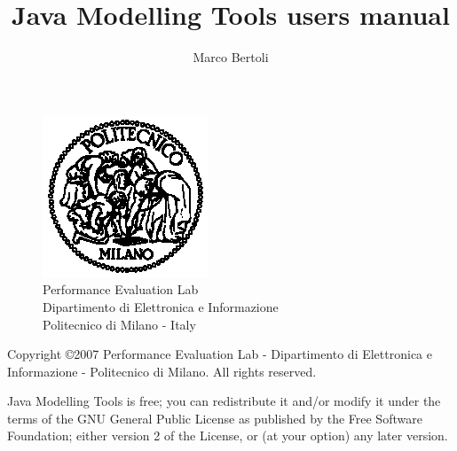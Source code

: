 \documentclass[10pt, twoside, a4paper]{book}
\author{Marco Bertoli}
\title{Java Modelling Tools users manual}
\begin{document}
\pagestyle{headings}  \setcounter{page}{-1}

\begin{titlepage}
\begin{figure}[h]
\begin{center}
\includegraphics{img/poli}\\
Performance Evaluation Lab\\
Dipartimento di Elettronica e Informazione\\
Politecnico di Milano - Italy
\end{center}
\end{figure}
\newlength{\centeroffset}
\setlength{\centeroffset}{-0.5\oddsidemargin}
\addtolength{\centeroffset}{0.5\evensidemargin}

\noindent\hspace*{\centeroffset}

\noindent\hspace*{\centeroffset}




\pagebreak
\begin{small}
  Copyright \copyright 2007 Performance Evaluation Lab - Dipartimento
  di Elettronica e Informazione - Politecnico di Milano.
  All rights reserved.

  Java Modelling Tools is free; you can redistribute it and/or modify it
  under the terms of the GNU General Public License as published by
  the Free Software Foundation; either version 2 of the License, or
  (at your option) any later version.


\end{small}
\end{titlepage}
\end{document}

